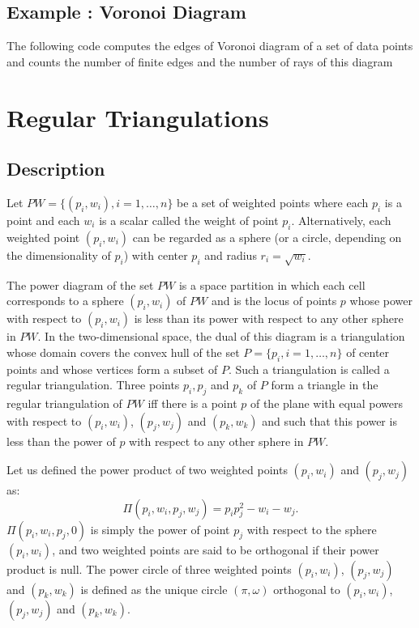 \subsection{Example : Voronoi Diagram}
\label{Subsection_2D_Triangulations_Voronoi}
The following code computes the edges of Voronoi diagram
of a set of data points
and counts  the number of finite edges and the number of rays
of this diagram


\section{Regular Triangulations}
\label{Section_2D_Triangulations_Regular}

\subsection{Description}
\label{Subsection_2D_Triangulations_Regular_Description}
Let ${  PW} = \{(p_i, w_i), i = 1, \ldots , n \}$ be a set of 
weighted points where each $p_i$ is a point and each $w_i$
is a scalar called the weight of point $p_i$.
Alternatively, each weighted point $(p_i, w_i)$ can be regarded
as a sphere (or a circle, depending on the dimensionality
of $p_i$)  with center $p_i$ and radius $r_i=\sqrt{w_i}$.

The power diagram of the set ${  PW}$ is a space partition in which
 each cell corresponds to a sphere $(p_i, w_i)$ of ${  PW}$
and is the locus of points  $p$ whose power with respect to $(p_i, w_i)$
is less than its power with respect to any other sphere 
in ${  PW}$. In the two-dimensional space,
the dual of this diagram is a triangulation 
whose domain covers the convex hull of the set 
${  P}= \{ p_i, i = 1, \ldots , n \}$ of center points
and whose vertices form a subset of ${  P}$.
Such a triangulation is called a regular triangulation.
Three points $p_i, p_j$ and $p_k$ of ${  P}$
form a triangle in the regular triangulation of ${  PW}$
iff there is a point $p$ of the plane with equal 
powers with respect to $(p_i, w_i)$, $(p_j, w_j)$
and $(p_k, w_k)$ and such that this power 
is  less than the power of $p$
with respect to any other sphere in  ${  PW}$.

Let us defined the power product of two weighted points
$(p_i, w_i)$ and $(p_j, w_j)$ as:
\[\Pi(p_i, w_i,p_j, w_j) = p_ip_j ^2 - w_i  - w_j  .\]
$\Pi(p_i, w_i,p_j, 0)$ is simply the power of point $p_j$
with respect to the sphere $(p_i, w_i)$, and two weighted points 
are said to be orthogonal if their power product is null.
The power circle of three weighted points
 $(p_i, w_i)$, $(p_j, w_j)$
and $(p_k, w_k)$ is defined as the unique circle
$(\pi, \omega)$  orthogonal to
 $(p_i, w_i)$, $(p_j, w_j)$
and $(p_k, w_k)$.

